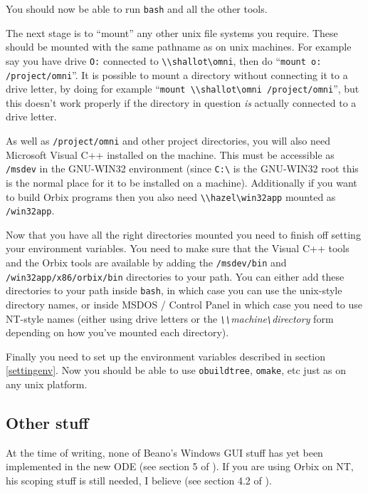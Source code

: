 \documentclass[11pt,twoside,onecolumn]{article}
\begin{document}
You should now be able to run {\tt bash} and all the other tools.  

The next stage is to ``mount'' any other unix file systems you require.  These
should be mounted with the same pathname as on unix machines.  For example say
you have drive \verb|O:| connected to \verb|\\shallot\omni|, then do
``\verb|mount o: /project/omni|''.  It is possible to mount a directory without
connecting it to a drive letter, by doing for example
``\verb|mount \\shallot\omni /project/omni|'', but this doesn't work properly
if the directory in question {\em is} actually connected to a drive letter.

As well as \verb|/project/omni| and other project directories, you will also
need Microsoft Visual C++ installed on the machine.  This must be accessible as
\verb|/msdev| in the GNU-WIN32 environment (since \verb|C:\| is the GNU-WIN32
root this is the normal place for it to be installed on a machine).
Additionally if you want to build Orbix programs then you also need
\verb|\\hazel\win32app| mounted as \verb|/win32app|.

Now that you have all the right directories mounted you need to finish off
setting your environment variables.  You need to make sure that the Visual C++
tools and the Orbix tools are available by adding the \verb|/msdev/bin| and
\verb|/win32app/x86/orbix/bin| directories to your path.  You can either add
these directories to your path inside {\tt bash}, in which case you can use the
unix-style directory names, or inside MSDOS / Control Panel in which case you
need to use NT-style names (either using drive letters or the {\it
\verb|\\|machine\verb|\|directory} form depending on how you've mounted each
directory).

Finally you need to set up the environment variables described in section
\ref{settingenv}.  Now you should be able to use {\tt obuildtree}, {\tt omake},
etc just as on any unix platform.

\subsection{Other stuff}

At the time of writing, none of Beano's Windows GUI stuff has yet been
implemented in the new ODE (see section 5 of \cite{ward95}). If you are
using Orbix on NT, his scoping stuff is still needed, I believe (see
section 4.2 of \cite{ward95}).
\end{document}
